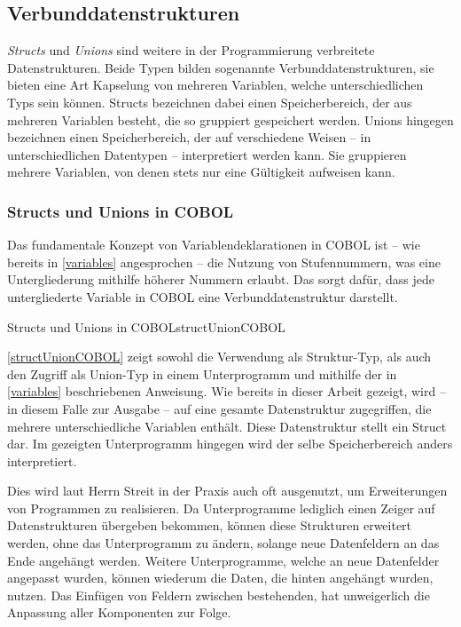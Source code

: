 \subsection{Verbunddatenstrukturen}\label{verbunddatenstrukturen}
\textit{Structs} und \textit{Unions} sind weitere in der Programmierung verbreitete Datenstrukturen. Beide Typen bilden sogenannte Verbunddatenstrukturen, \dahe sie bieten eine Art Kapselung von mehreren Variablen, welche unterschiedlichen Typs sein können. Structs bezeichnen dabei einen Speicherbereich, der aus mehreren Variablen besteht, die so gruppiert gespeichert werden. Unions hingegen bezeichnen einen Speicherbereich, der auf verschiedene Weisen -- in unterschiedlichen Datentypen -- interpretiert werden kann. Sie gruppieren mehrere Variablen, von denen stets nur eine Gültigkeit aufweisen kann.

\subsubsection*{Structs und Unions in COBOL}

Das fundamentale Konzept von Variablendeklarationen in COBOL ist -- wie bereits in \autoref{variables} angesprochen -- die Nutzung von Stufennummern, was eine Untergliederung mithilfe höherer Nummern erlaubt. Das sorgt dafür, dass jede untergliederte Variable in COBOL eine Verbunddatenstruktur darstellt.

\begin{codeWithCaption}{Structs und Unions in COBOL}{structUnionCOBOL}
 \cFollow
{} \cFollow
{}
\end{codeWithCaption}

\autoref{structUnionCOBOL} zeigt sowohl die Verwendung als Struktur-Typ, als auch den Zugriff als Union-Typ in einem Unterprogramm und mithilfe der in \autoref{variables} beschriebenen  Anweisung. Wie bereits in dieser Arbeit gezeigt, wird -- in diesem Falle zur Ausgabe -- auf eine gesamte Datenstruktur zugegriffen, die mehrere unterschiedliche Variablen enthält. Diese Datenstruktur stellt ein Struct dar. Im gezeigten Unterprogramm hingegen wird der selbe Speicherbereich anders interpretiert.

Dies wird laut Herrn Streit in der Praxis auch oft ausgenutzt, um Erweiterungen von Programmen zu realisieren. Da Unterprogramme lediglich einen Zeiger auf Datenstrukturen übergeben bekommen, können diese Strukturen erweitert werden, ohne das Unterprogramm zu ändern, solange neue Datenfeldern an das Ende angehängt werden. Weitere Unterprogramme, welche an neue Datenfelder angepasst wurden, können wiederum die Daten, die hinten angehängt wurden, nutzen. Das Einfügen von Feldern zwischen bestehenden, hat unweigerlich die Anpassung aller Komponenten zur Folge.

